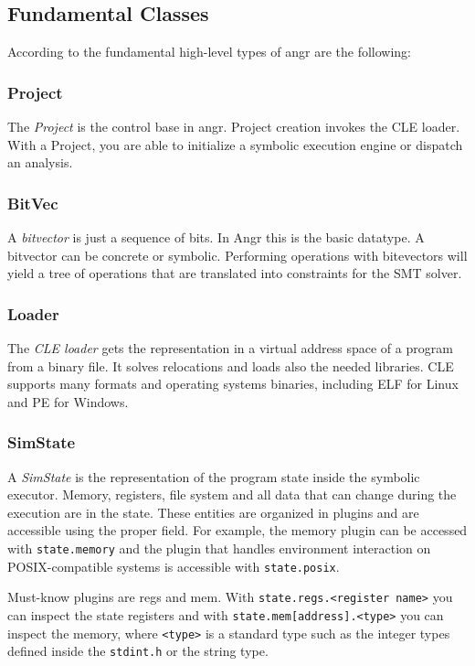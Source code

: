 \subsection{Fundamental Classes}

According to \cite{angrdoc} the fundamental high-level types of angr are the following:

\subsubsection{Project}

The {\em Project} is the control base in angr. Project creation invokes the CLE loader. With a Project, you are able to initialize a symbolic execution engine or dispatch an analysis.

\subsubsection{BitVec}

A {\em bitvector} is just a sequence of bits. In Angr this is the basic datatype. A bitvector can be concrete or symbolic. Performing operations with bitevectors will yield a tree of operations that are translated into constraints for the SMT solver.

\subsubsection{Loader}

The {\em CLE loader} gets the representation in a virtual address space of a program from a binary file. It solves relocations and loads also the needed libraries. CLE supports many formats and operating systems binaries, including ELF for Linux and PE for Windows.

\subsubsection{SimState}

A {\em SimState} is the representation of the program state inside the symbolic executor. Memory, registers, file system and all data that can change during the execution are in the state.
These entities are organized in plugins and are accessible using the proper field. For example, the memory plugin can be accessed with \verb|state.memory| and the plugin that handles environment interaction on POSIX-compatible systems is accessible with \verb|state.posix|.

Must-know plugins are regs and mem. With \verb|state.regs.<register name>| you can inspect the state registers and with \verb|state.mem[address].<type>| you can inspect the memory, where  \verb|<type>| is a standard type such as the integer types defined inside the {\tt stdint.h} or the string type.

